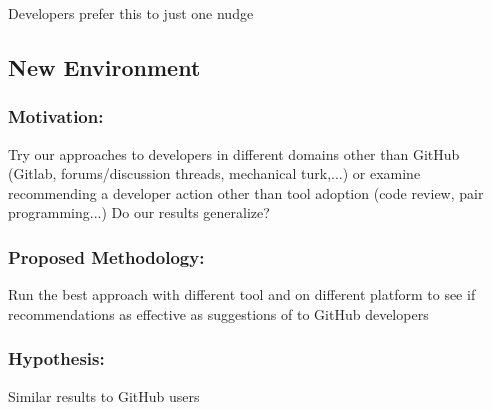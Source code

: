 Developers prefer this to just one nudge

\subsection{New Environment}

\subsubsection{Motivation:}

Try our approaches to developers in different domains other than GitHub (Gitlab, forums/discussion threads, mechanical turk,...) or examine recommending a developer action other than tool adoption (code review, pair programming...) Do our results generalize?

\subsubsection{Proposed Methodology:}

Run the best approach with different tool and on different platform to see if recommendations as effective as suggestions of \EP to GitHub developers

\subsubsection{Hypothesis:}

Similar results to GitHub users

